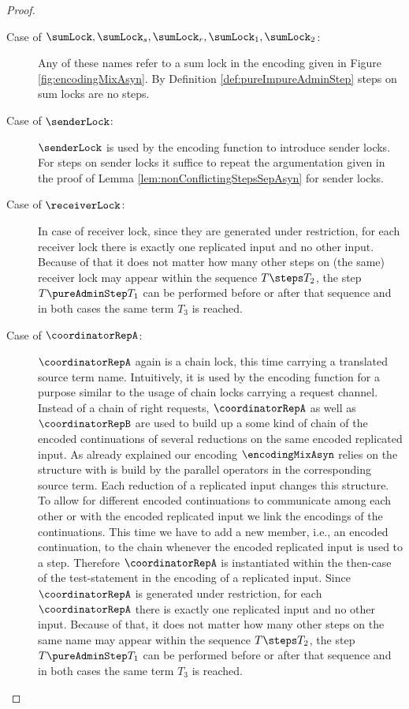 \documentclass[]{llncs}
\begin{document}
\begin{proof}
\begin{description}
		\item[Case of $ \sumLock, \sumLock_s, \sumLock_r, \sumLock_1, \sumLock_2 $:] Any of these names refer to a sum lock in the encoding given in Figure \ref{fig:encodingMixAsyn}. By Definition \ref{def:pureImpureAdminStep} steps on sum locks are no \pure \admin steps.
		\item[Case of $ \senderLock $:] $ \senderLock $ is used by the encoding function to introduce sender locks. For steps on sender locks it suffice to repeat the argumentation given in the proof of Lemma \ref{lem:nonConflictingStepsSepAsyn} for sender locks.
		\item[Case of $ \receiverLock $:] In case of receiver lock, since they are generated under restriction, for each receiver lock there is exactly one replicated input and no other input. Because of that it does not matter how many other steps on (the same) receiver lock may appear within the sequence $ T \steps T_2 $, the step $ T \pureAdminStep T_1 $ can be performed before or after that sequence and in both cases the same term $ T_3 $ is reached.
		\item[Case of $ \coordinatorRepA $:] $ \coordinatorRepA $ again is a chain lock, this time carrying a translated source term name. Intuitively, it is used by the encoding function for a purpose similar to the usage of chain locks carrying a request channel. Instead of a chain of right requests, $ \coordinatorRepA $ as well as $ \coordinatorRepB $ are used to build up a some kind of chain of the encoded continuations of several reductions on the same encoded replicated input. As already explained our encoding $ \encodingMixAsyn $ relies on the structure with is build by the parallel operators in the corresponding source term. Each reduction of a replicated input changes this structure. To allow for different encoded continuations to communicate among each other or with the encoded replicated input we link the encodings of the continuations. This time we have to add a new member, i.e., an encoded continuation, to the chain whenever the encoded replicated input is used to \simulate a step. Therefore $ \coordinatorRepA $ is instantiated within the then-case of the test-statement in the encoding of a replicated input. Since $ \coordinatorRepA $ is generated under restriction, for each $ \coordinatorRepA $ there is exactly one replicated input and no other input. Because of that, it does not matter how many other steps on the same name may appear within the sequence $ T \steps T_2 $, the step $ T \pureAdminStep T_1 $ can be performed before or after that sequence and in both cases the same term $ T_3 $ is reached.

\end{description}
\end{proof}
\end{document}
